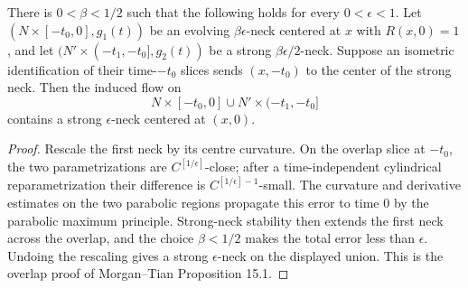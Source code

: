 \begin{proposition}
\label{prop:evolving-neck-gluing}
\notready
There is $0<\beta<1/2$ such that the following holds for every
$0<\epsilon<1$.  Let
$(N\times[-t_0,0],g_1(t))$ be an evolving
$\beta\epsilon$-neck centered at $x$ with $R(x,0)=1$, and let
$(N'\times(-t_1,-t_0],g_2(t))$ be a strong
$\beta\epsilon/2$-neck.  Suppose an isometric identification of their
time-$-t_0$ slices sends $(x,-t_0)$ to the center of the strong neck.
Then the induced flow on
\[
 N\times[-t_0,0]\mathbin{\cup}N'\times(-t_1,-t_0]
\]
contains a strong $\epsilon$-neck centered at $(x,0)$.
\end{proposition}

\begin{proof}
Rescale the first neck by its centre curvature.  On the overlap slice at
$-t_0$, the two parametrizations are $C^{[1/\epsilon]}$-close; after a
time-independent cylindrical reparametrization their difference is
$C^{[1/\epsilon]-1}$-small.  The curvature and derivative estimates on the
two parabolic regions propagate this error to time $0$ by the parabolic
maximum principle.  Strong-neck stability then extends the first neck across
the overlap, and the choice $\beta<1/2$ makes the total error less than
$\epsilon$.  Undoing the rescaling gives a strong $\epsilon$-neck on the
displayed union.  This is the overlap proof of Morgan--Tian Proposition 15.1.
\end{proof}

